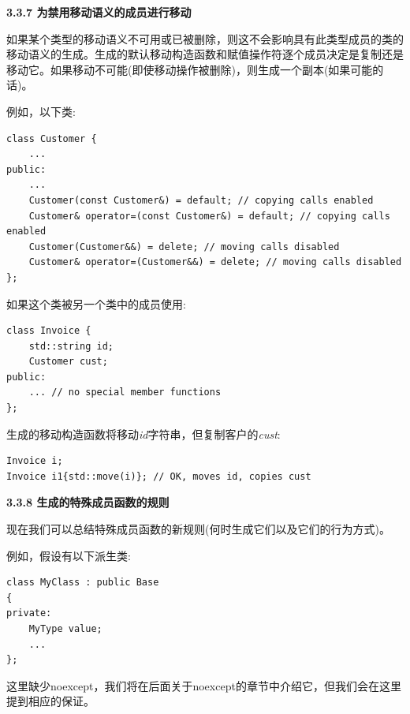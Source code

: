 \hspace*{\fill} \par %
\textbf{3.3.7 为禁用移动语义的成员进行移动}

如果某个类型的移动语义不可用或已被删除，则这不会影响具有此类型成员的类的移动语义的生成。生成的默认移动构造函数和赋值操作符逐个成员决定是复制还是移动它。如果移动不可能(即使移动操作被删除)，则生成一个副本(如果可能的话)。\par

例如，以下类:\par

\begin{lstlisting}[caption={}]
class Customer {
	...
public:
	...
	Customer(const Customer&) = default; // copying calls enabled
	Customer& operator=(const Customer&) = default; // copying calls enabled
	Customer(Customer&&) = delete; // moving calls disabled
	Customer& operator=(Customer&&) = delete; // moving calls disabled
};
\end{lstlisting}

如果这个类被另一个类中的成员使用:\par

\begin{lstlisting}[caption={}]
class Invoice {
	std::string id;
	Customer cust;
public:
	... // no special member functions
};
\end{lstlisting}

生成的移动构造函数将移动\textit{id}字符串，但复制客户的\textit{cust}:\par

\begin{lstlisting}[caption={}]
Invoice i;
Invoice i1{std::move(i)}; // OK, moves id, copies cust
\end{lstlisting}

\hspace*{\fill} \par %
\textbf{3.3.8 生成的特殊成员函数的规则}

现在我们可以总结特殊成员函数的新规则(何时生成它们以及它们的行为方式)。\par

例如，假设有以下派生类:\par

\begin{lstlisting}[caption={}]
class MyClass : public Base
{
private:
	MyType value;
	...
};
\end{lstlisting}

这里缺少noexcept，我们将在后面关于noexcept的章节中介绍它，但我们会在这里提到相应的保证。\par

